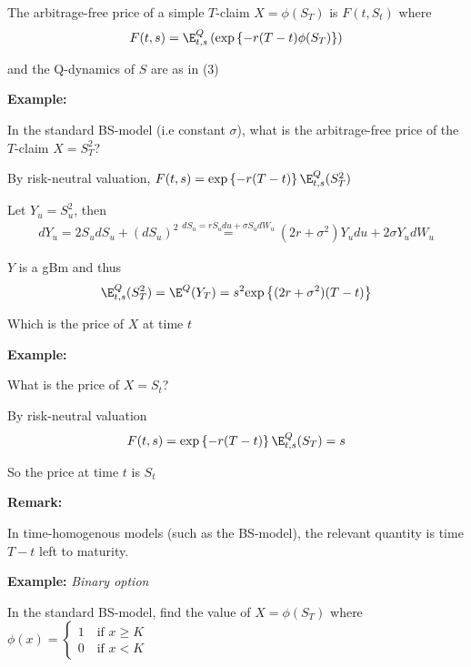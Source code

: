 \par\bigskip
\begin{theo}[]{}
  The arbitrage-free price of a simple $T$-claim $X= \phi(S_T)$ is $F(t,S_t)$ where
  \begin{equation*}
    \begin{gathered}
      F(t,s) = \E_{t,s}^Q\left(\text{exp}\left\{-r(T-t)\phi(S_T)\right\}\right)
    \end{gathered}
  \end{equation*}\par
  \noindent and the Q-dynamics of $S$ are as in (3)
\end{theo}
\par\bigskip
\noindent\textbf{Example:}\par
\noindent In the standard BS-model (i.e constant $\sigma$), what is the arbitrage-free price of the $T$-claim $X=S_T^2$?\par
\noindent By risk-neutral valuation, $F(t,s) = \text{exp}\left\{-r(T-t)\right\}\E_{t,s}^Q(S_T^2)$\par
\noindent Let $Y_u =S_u^2$, then
\begin{equation*}
  \begin{gathered}
    dY_u = 2S_udS_u+(dS_u)^2\stackrel{dS_u = rS_udu+\sigma S_udW_u}{=}(2r+\sigma^2)Y_udu+2\sigma Y_udW_u
  \end{gathered}
\end{equation*}\par
\noindent $Y$ is a gBm and thus
\begin{equation*}
  \begin{gathered}
    \E_{t,s}^Q(S_T^2) = \E^Q(Y_T) = s^2\text{exp}\left\{(2r+\sigma^2)(T-t)\right\}
  \end{gathered}
\end{equation*}\par
\noindent Which is the price of $X$ at time $t$
\par\bigskip
\noindent\textbf{Example:}\par
\noindent What is the price of $X = S_t$?\par
\noindent By risk-neutral valuation
\begin{equation*}
  \begin{gathered}
    F(t,s) = \text{exp}\left\{-r(T-t)\right\}\E_{t,s}^Q(S_T) = s
  \end{gathered}
\end{equation*}\par
\noindent So the price at time $t$ is $S_t$
\par\bigskip
\noindent\textbf{Remark:}\par
\noindent In time-homogenous models (such as the BS-model), the relevant quantity is time $T-t$ left to maturity.
\par\bigskip
\noindent\textbf{Example:} \textit{Binary option}\par
\noindent In the standard BS-model, find the value of $X = \phi(S_T)$ where $\phi(x) = \begin{cases}
  1\quad\text{if } x\geq K\\
  0\quad\text{if } x<K
\end{cases}$
\par\bigskip

